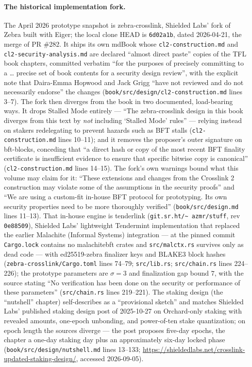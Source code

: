 \documentclass[11pt,a4paper]{article}
\theoremstyle{definition}
\begin{document}
\paragraph{The historical implementation fork.} The April 2026 prototype
snapshot is zebra-crosslink, Shielded Labs' fork of Zebra built with
Eiger; the local clone HEAD is \texttt{6d02a1b}, dated 2026-04-21, the
merge of PR \#282. It ships its own mdBook whose
\texttt{cl2-construction.md} and \texttt{cl2-security-analysis.md} are
declared ``almost direct paste'' copies of the TFL book chapters,
committed verbatim ``for the purposes of precisely committing to a
\ldots{} precise set of book contents for a security design review'',
with the explicit note that Daira-Emma Hopwood and Jack Grigg ``have not
reviewed and do not necessarily endorse'' the changes
(\texttt{book/src/design/cl2-construction.md} lines 3--7). The fork then
diverges from the book in two documented, load-bearing ways. It drops
Stalled Mode entirely --- ``The zebra-crosslink design in this book
diverges from this text by \emph{not} including `Stalled Mode' rules''
--- relying instead on stakers redelegating to prevent hazards such as
BFT stalls (\texttt{cl2-construction.md} lines 10--11); and it removes
the proposer's outer signature on bft-blocks, conceding that ``a direct
hash or copy of the most recent BFT finality certificate is insufficient
evidence to ensure that specific bitwise copy is canonical''
(\texttt{cl2-construction.md} lines 14--15). The fork's own warnings
bound what this volume may claim for it: ``These extensions and changes
from the Crosslink 2 construction may violate some of the assumptions in
the security proofs'' and ``We are using a custom-fit in-house BFT
protocol for prototyping. Its own security properties need to be more
thoroughly verified'' (\texttt{book/src/design.md} lines 11--13). That
in-house engine is tenderlink (\texttt{git.sr.ht/\textasciitilde
azmr/stuff}, rev \texttt{0e88509}), Shielded Labs' lightweight
Tendermint implementation that replaced the earlier Malachite (Informal
Systems) integration --- at the pinned commit \texttt{Cargo.lock}
contains no malachitebft crates and \texttt{src/malctx.rs} survives only
as dead code --- with ed25519-zebra finalizer keys and BLAKE3 block
hashes (\texttt{zebra-crosslink/Cargo.toml} lines 74--79;
\texttt{src/lib.rs}; \texttt{src/chain.rs} lines 224--226); the
prototype parameters are $\sigma = 3$ and finalization gap bound $7$,
with the source stating ``No verification has been done on the security
or performance of these parameters'' (\texttt{src/chain.rs} lines
219--221). The staking design (the ``nutshell'' chapter) self-describes
as a ``provisional sketch'' and matches Shielded Labs' published staking
design post of 2025-10-27 on Orchard-only staking with revealed amounts,
one-epoch unbonding, and power-of-ten stake quantization; on epoch length
the sources diverge --- the post proposes five-day epochs, the chapter a
one-day staking day plus an approximately six-day locked phase
(\texttt{book/src/design/nutshell.md} lines 13--133;
\url{https://shieldedlabs.net/crosslink-updated-staking-design/},
accessed 2026-09-05).
\end{document}
